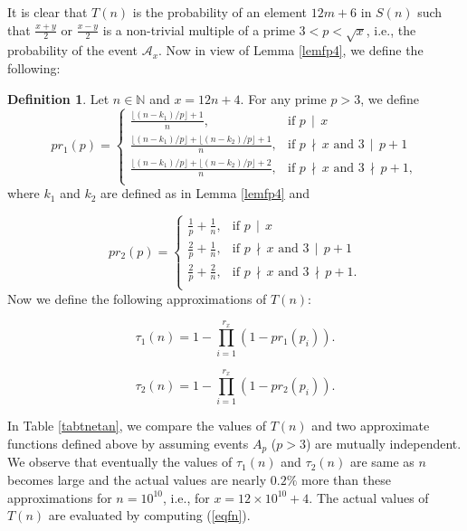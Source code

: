 \documentclass[11pt]{article}
\theoremstyle{definition}
\newtheorem{definition}[theorem]{Definition}
\theoremstyle{remark}
\numberwithin{equation}{section}
\newcommand{\Nat}{\mathbb{N}}
\newcommand{\Div}[2]{#1\,\mid\, #2}
\newcommand{\nDiv}[2]{#1\,\nmid\, #2}
\begin{document}
\noindent
It is clear that $T(n)$ is the probability of an element $12m+6$ in $S(n)$ such that $\frac{x+y}{2}$ or $\frac{x-y}{2}$ is a non-trivial multiple of a prime $3<p<\sqrt{x}$, i.e., the probability of the event $\mathscr{A}_x$. Now in view of Lemma \ref{lemfp4}, we define the following:
	
\begin{definition}\label{defeta13}
Let $n\in\Nat$ and $x=12n+4$. For any prime $p>3$, we define
$$pr_1(p)=\left\{\begin{array}{ll}
\frac{\lfloor (n-k_1)/p\rfloor+1}{n}, & \text{if } \Div{p}{x}\\
\frac{\lfloor (n-k_1)/p\rfloor + \lfloor (n-k_2)/p\rfloor +1}{n}, & \text{if } \nDiv{p}{x}\text{ and } \Div{3}{p+1}\\
\frac{\lfloor (n-k_1)/p\rfloor + \lfloor (n-k_2)/p\rfloor +2}{n}, & \text{if } \nDiv{p}{x}\text{ and } \nDiv{3}{p+1},\\
\end{array}\right.$$
where $k_1$ and $k_2$ are defined as in Lemma \ref{lemfp4} and

$$pr_2 (p)=\left\{\begin{array}{ll}
\frac{1}{p}+\frac{1}{n}, & \text{if } \Div{p}{x}\\
\frac{2}{p}+\frac{1}{n}, & \text{if } \nDiv{p}{x}\text{ and } \Div{3}{p+1}\\
\frac{2}{p}+\frac{2}{n}, & \text{if } \nDiv{p}{x}\text{ and } \nDiv{3}{p+1}.\\
\end{array}\right.$$
Now we define the following approximations of $T(n)$:

\begin{equation}\label{eqneta5n}
\tau_1(n)=1-\prod\limits_{i=1}^{r_x} (1-pr_1(p_i)).
\end{equation}

\begin{equation}\label{eqneta6n}
\tau_2(n)=1-\prod\limits_{i=1}^{r_x} (1-pr_2 (p_i)).
\end{equation}
\end{definition}

\noindent
In Table \ref{tabtnetan}, we compare the values of $T(n)$ and two approximate functions defined above by assuming events $A_p$ ($p>3$) are mutually independent. We observe that eventually the values of $\tau_1(n)$ and $\tau_2(n)$ are same as $n$ becomes large and the actual values are nearly $0.2\%$ more than these approximations for $n=10^{10}$, i.e., for $x=12\times 10^{10}+4$. The actual values of $T(n)$ are evaluated by computing (\ref{eqfn}). 
\end{document}

